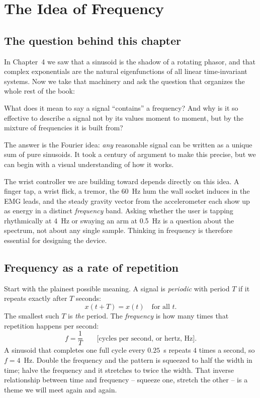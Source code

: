 \chapter{The Idea of Frequency}

\section{The question behind this chapter}

In Chapter~4 we saw that a sinusoid is the shadow of a rotating phasor, and that
complex exponentials are the natural eigenfunctions of all linear time-invariant systems.
Now we take that machinery and ask the question that organizes the whole rest of the book:

\begin{focusbox}
What does it mean to say a signal ``contains'' a frequency? And why is it so
effective to describe a signal not by its values moment to moment, but by the
mixture of frequencies it is built from?
\end{focusbox}

The answer is the Fourier idea: \emph{any} reasonable signal can be written as a unique sum of pure sinusoids. It took a century of argument to make this precise, but we can begin with a visual understanding of how it works.

\begin{goalbox}
The wrist controller we are building toward depends directly on this idea. A finger
tap, a wrist flick, a tremor, the 60~Hz hum the wall socket induces in the EMG
leads, and the steady gravity vector from the accelerometer each show
up as energy in a distinct \emph{frequency} band. Asking whether the user is
tapping rhythmically at 4~Hz or swaying an arm at 0.5~Hz is a question
about the spectrum, not about any single sample. Thinking in frequency is
therefore essential for designing the device.
\end{goalbox}

\section{Frequency as a rate of repetition}

Start with the plainest possible meaning. A signal is \emph{periodic} with period $T$
if it repeats exactly after $T$ seconds:
\[
  x(t+T) = x(t) \quad \text{for all } t.
\]
The smallest such $T$ is \emph{the} period. The \emph{frequency} is how many
times that repetition happens per second:
\[
  f = \frac{1}{T} \qquad \text{[cycles per second, or hertz, Hz]}.
\]
A sinusoid that completes one full cycle every $0.25$~s repeats $4$ times a second,
so $f = 4$~Hz. Double the frequency and the pattern is squeezed to half the width
in time; halve the frequency and it stretches to twice the width. That inverse
relationship between time and frequency -- squeeze one, stretch the other -- is a
theme we will meet again and again.

